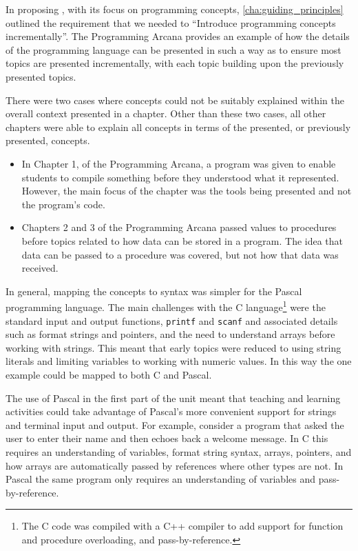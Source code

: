 In proposing , with its focus on programming concepts, \cref{cha:guiding_principles} outlined the requirement that we needed to ``Introduce programming concepts incrementally''. The Programming Arcana provides an example of how the details of the programming language can be presented in such a way as to ensure most topics are presented incrementally, with each topic building upon the previously presented topics. 

There were two cases where concepts could not be suitably explained within the overall context presented in a chapter. Other than these two cases, all other chapters were able to explain all concepts in terms of the presented, or previously presented, concepts.
\begin{itemize}[noitemsep,nolistsep]
  \item In Chapter 1, of the Programming Arcana, a program was given to enable students to compile something before they understood what it represented. However, the main focus of the chapter was the tools being presented and not the program's code. 
  \item Chapters 2 and 3 of the Programming Arcana passed values to procedures before topics related to how data can be stored in a program. The idea that data can be passed to a procedure was covered, but not how that data was received.
\end{itemize}

In general, mapping the concepts to syntax was simpler for the Pascal programming language. The main challenges with the C language\footnote{The C code was compiled with a C++ compiler to add support for function and procedure overloading, and pass-by-reference.} were the standard input and output functions, \texttt{printf} and \texttt{scanf} and associated details such as format strings and pointers, and the need to understand arrays before working with strings. This meant that early topics were reduced to using string literals and limiting variables to working with numeric values. In this way the one example could be mapped to both C and Pascal. 

The use of Pascal in the first part of the unit meant that teaching and learning activities could take advantage of Pascal's more convenient support for strings and terminal input and output. For example, consider a program that asked the user to enter their name and then echoes back a welcome message. In C this requires an understanding of variables, format string syntax, arrays, pointers, and how arrays are automatically passed by references where other types are not. In Pascal the same program only requires an understanding of variables and pass-by-reference.

